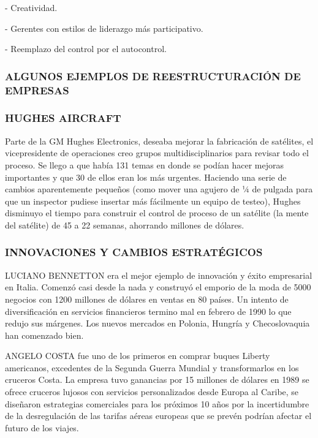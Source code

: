 - Creatividad.

- Gerentes con estilos de liderazgo más participativo.

- Reemplazo del control por el autocontrol.

\subsubsection*{ALGUNOS EJEMPLOS DE REESTRUCTURACIÓN DE EMPRESAS}

\begin{recuadro}
\subsubsection*{HUGHES AIRCRAFT}
Parte de la GM Hughes Electronics, deseaba mejorar la fabricación de satélites, el vicepresidente de operaciones creo grupos multidisciplinarios para revisar todo el proceso. Se llego a que había 131 temas en donde se podían hacer mejoras importantes y que 30 de ellos eran los más urgentes. Haciendo una serie de cambios aparentemente pequeños (como mover una agujero de ¼ de pulgada para que un inspector pudiese insertar más fácilmente un equipo de testeo), Hughes disminuyo el tiempo para construir el control de proceso de un satélite (la mente del satélite) de 45 a 22 semanas, ahorrando millones de dólares.
\end{recuadro}


\begin{recuadro}
\subsubsection*{INNOVACIONES Y CAMBIOS ESTRATÉGICOS}
LUCIANO BENNETTON era el mejor ejemplo de innovación y éxito empresarial en Italia. Comenzó casi desde la nada y construyó el emporio de la moda de 5000 negocios con 1200 millones de dólares en ventas en 80 países. Un intento de diversificación en servicios financieros termino mal en febrero de 1990 lo que redujo sus márgenes. Los nuevos mercados en Polonia, Hungría y Checoslovaquia han comenzado bien.

ANGELO COSTA fue uno de los primeros en comprar buques Liberty americanos, excedentes de la Segunda Guerra Mundial y transformarlos en los cruceros Costa. La empresa tuvo ganancias por 15 millones de dólares en 1989 se ofrece cruceros lujosos con servicios personalizados desde Europa al Caribe, se diseñaron estrategias comerciales para los próximos 10 años por la incertidumbre de la desregulación de las tarifas aéreas europeas que se prevén podrían afectar el futuro de los viajes.
\end{recuadro}

